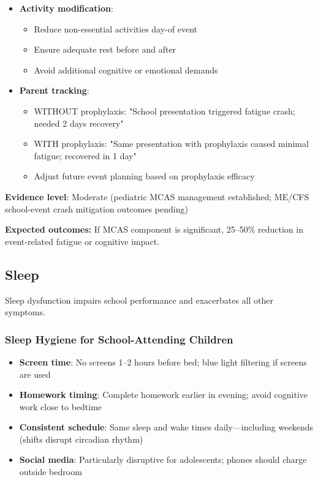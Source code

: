 \begin{recommendation}
\begin{enumerate}
\begin{itemize}
        \item \textbf{Activity modification}:
        \begin{itemize}
            \item Reduce non-essential activities day-of event
            \item Ensure adequate rest before and after
            \item Avoid additional cognitive or emotional demands
        \end{itemize}

        \item \textbf{Parent tracking}:
        \begin{itemize}
            \item WITHOUT prophylaxis: "School presentation triggered fatigue crash; needed 2 days recovery"
            \item WITH prophylaxis: "Same presentation with prophylaxis caused minimal fatigue; recovered in 1 day"
            \item Adjust future event planning based on prophylaxis efficacy
        \end{itemize}
    \end{itemize}
\end{enumerate}

\textbf{Evidence level}: Moderate (pediatric MCAS management established; ME/CFS school-event crash mitigation outcomes pending)

\textbf{Expected outcomes:} If MCAS component is significant, 25--50\% reduction in event-related fatigue or cognitive impact.

\end{recommendation}

\subsection{Sleep}
\label{subsec:ped-ambulatory-sleep}

Sleep dysfunction impairs school performance and exacerbates all other symptoms.

\subsubsection{Sleep Hygiene for School-Attending Children}

\begin{itemize}
    \item \textbf{Screen time}: No screens 1--2 hours before bed; blue light filtering if screens are used
    \item \textbf{Homework timing}: Complete homework earlier in evening; avoid cognitive work close to bedtime
    \item \textbf{Consistent schedule}: Same sleep and wake times daily---including weekends (shifts disrupt circadian rhythm)
    \item \textbf{Social media}: Particularly disruptive for adolescents; phones should charge outside bedroom
\end{itemize}

